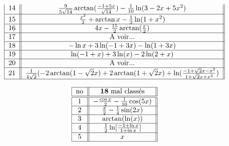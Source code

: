\[\begin{tabular}{| c || c ||  }
              $14$  &  $\frac{9}{5\sqrt{14}}\arctan(\frac{-1+5x}{\sqrt{14}})-\frac{1}{10}\ln(3-2x+5x^2)$			                                                               \\ \hline   
              $15$  &  $\frac{x^2}{2}+\arctan x-\frac{1}{2}\ln(1+x^2)$			                                                               \\ \hline   
              $16$  &  $4x-\frac{15}{2}\arctan(\frac{x}{2})$			                                                               \\ \hline   
              $17$  & A voir...		                                                               \\ \hline   
              $18$  &  $-\ln x +3\ln(-1+3x)-\ln(1+3x)$			                                                               \\ \hline   
              $19$  &  $\ln(-1+ x) +3\ln(x)-2\ln(2+x)$			                                                               \\ \hline   
              $20$  & A voir...	                                                               \\ \hline   
              $21$  &  $\frac{1}{4\sqrt2}(-2\arctan(1-\sqrt2 x)+2\arctan(1+\sqrt2x)+\ln(\frac{-1+\sqrt2x-x^2}{1+\sqrt2x+x^2})$			                                                               \\ \hline   
\end{tabular} \]


\[ \begin{tabular}{| c || c ||  }
\hline       no &         ${\bf 18}                              $       mal classés                                                                                                        \\    \hline \hline
             $1$   & $-\frac{\cos x}{2}-\frac{1}{10}\cos(5x)      $            \\ \hline 
            $2$   &  $ \frac{x}{2}-\frac{1}{4}\sin(2x)$                 \\ \hline

           $3$   &      $  \arctan(\ln(x)) $ 						\\ \hline 
           $4$   &      $   \frac{1}{2}\ln[\frac{-1+\ln x}{1+\ln x}]            $                                                 				\\ \hline 
           $5$	  &      $x$                                                       \\ \hline   
\end{tabular} \]





